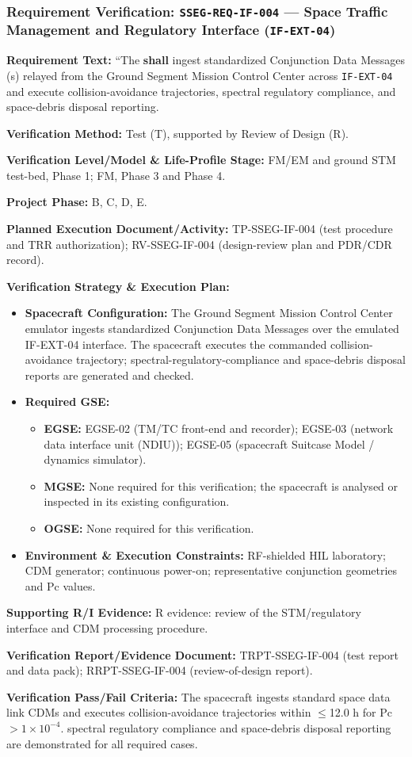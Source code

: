 \subsubsection{Requirement Verification: \texttt{SSEG-REQ-IF-004} --- Space Traffic Management and Regulatory Interface (\texttt{IF-EXT-04})}
\label{ver:SSEG-REQ-IF-004}
\textbf{Requirement Text:} ``The  \textbf{shall} ingest standardized Conjunction Data Messages (s) relayed from the Ground Segment Mission Control Center across \texttt{IF-EXT-04} and execute collision-avoidance trajectories, spectral regulatory compliance, and space-debris disposal reporting.
\par\textbf{Verification Method:} Test (T), supported by Review of Design (R).
\par\textbf{Verification Level/Model \& Life-Profile Stage:} FM/EM and ground STM test-bed, Phase 1; FM, Phase 3 and Phase 4.
\par\textbf{Project Phase:} B, C, D, E.
\par\textbf{Planned Execution Document/Activity:} TP-SSEG-IF-004 (test procedure and TRR authorization); RV-SSEG-IF-004 (design-review plan and PDR/CDR record).
\par\textbf{Verification Strategy \& Execution Plan:}
\begin{itemize}
\item \textbf{Spacecraft Configuration:} The Ground Segment Mission Control Center emulator ingests standardized Conjunction Data Messages over the emulated IF-EXT-04 interface. The spacecraft executes the commanded collision-avoidance trajectory; spectral-regulatory-compliance and space-debris disposal reports are generated and checked.
\item \textbf{Required GSE:}
\begin{itemize}
\item \textbf{EGSE:} EGSE-02 (TM/TC front-end and recorder); EGSE-03 (network data interface unit (NDIU)); EGSE-05 (spacecraft Suitcase Model / dynamics simulator).
\item \textbf{MGSE:} None required for this verification; the spacecraft is analysed or inspected in its existing configuration.
\item \textbf{OGSE:} None required for this verification.
\end{itemize}
\item \textbf{Environment \& Execution Constraints:} RF-shielded HIL laboratory; CDM generator; continuous power-on; representative conjunction geometries and Pc values.
\end{itemize}
\par\textbf{Supporting R/I Evidence:} R evidence: review of the STM/regulatory interface and CDM processing procedure.
\par\textbf{Verification Report/Evidence Document:} TRPT-SSEG-IF-004 (test report and data pack); RRPT-SSEG-IF-004 (review-of-design report).
\par\textbf{Verification Pass/Fail Criteria:} The spacecraft ingests standard space data link CDMs and executes collision-avoidance trajectories within $\le$12.0 h for Pc $>$$1\times10^{-4}$. spectral regulatory compliance and space-debris disposal reporting are demonstrated for all required cases.
\par\medskip
